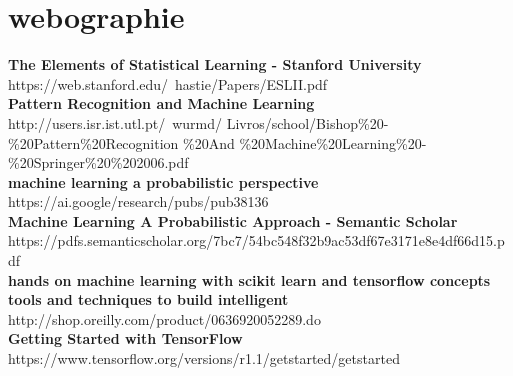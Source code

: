 \documentclass[11pt, oneside]{Thesis} %
\begin{document}
\mainmatter %

\pagestyle{fancy} %






% 
%
% 
% 
% 
% 



\chapter*{webographie}

\textbf{The Elements of Statistical Learning - Stanford University}\\https://web.stanford.edu/~hastie/Papers/ESLII.pdf\\

\textbf{Pattern Recognition and Machine Learning}\\http://users.isr.ist.utl.pt/~wurmd/ Livros/school/Bishop\%20-\%20Pattern\%20Recognition \%20And \%20Machine\%20Learning\%20-\%20Springer\%20\%202006.pdf\\

\textbf{machine learning a probabilistic perspective}\\https://ai.google/research/pubs/pub38136\\

\textbf{Machine Learning A Probabilistic Approach - Semantic Scholar}\\https://pdfs.semanticscholar.org/7bc7/54bc548f32b9ac53df67e3171e8e4df66d15.pdf\\

\textbf{hands on machine learning with scikit learn and tensorflow concepts tools and techniques to build intelligent}\\http://shop.oreilly.com/product/0636920052289.do\\

\textbf{Getting Started with TensorFlow}\\https://www.tensorflow.org/versions/r1.1/getstarted/getstarted\\
\end{document}
